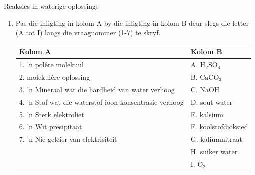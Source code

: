 {{\begin{eocexercises}{Reaksies in waterige oplossings}
\begin{enumerate}[noitemsep, label=\textbf{\arabic*}. ]
\begin{enumerate}[noitemsep, label=\textbf{\alph*}. ]
\end{enumerate}
\label{m38719*uid112}\item Pas die inligting in kolom A by die inligting in kolom B deur slegs die letter (A tot I) langs die vraagnommer (1-7) te skryf.
          \begin{table}[H]
        \begin{center}
      \label{m38719*id342952}
    \noindent
      \begin{tabular}{|l|l|}\hline
        \textbf{Kolom A} &
        \textbf{Kolom B} \\ \hline
        1.  'n pol\^{e}re molekuul &
        A. ${\text{H}}_{2}{\text{SO}}_{4}$ \\ \hline
        2. molekul\^{e}re oplossing &
        B. ${\text{CaCO}}_{3}$ \\ \hline
        3.   'n Mineraal wat die hardheid van water verhoog &
        C. $\text{NaOH}$ \\ \hline
        4.    'n Stof wat die waterstof-ioon konsentrasie verhoog &
        D. sout water \\ \hline
        5.   'n Sterk elektroliet &
        E. kalsium \\ \hline
        6.   'n Wit presipitaat &
        F. koolstofdioksied \\ \hline
        7.  'n Nie-geleier van elektrisiteit &
        G. kaliumnitraat \\ \hline
         &
        H. suiker water \\ \hline
         &
        I. ${\text{O}}_{2}$ \\ \hline
    \end{tabular}
      \end{center}
\end{table}
    \par


\end{enumerate}
\end{eocexercises}}}
